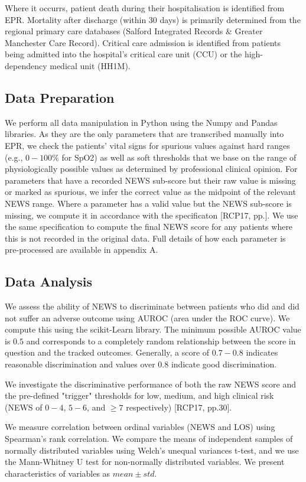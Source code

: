\documentclass[10pt,journal, compsoc]{IEEEtran}
\begin{document}
Where it occurrs, patient death during their hospitalisation is identified from EPR. Mortality after discharge (within 30 days) is primarily determined from the regional primary care databases (Salford Integrated Records \& Greater Manchester Care Record). Critical care admission is identified from patients being admitted into the hospital's critical care unit (CCU) or the high-dependency medical unit (HH1M).

\subsection{Data Preparation} We perform all data manipulation in Python using the Numpy and Pandas libraries. As they are the only parameters that are transcribed manually into EPR, we check the patients' vital signs for spurious values against hard ranges (e.g., $0-100\%$ for SpO2) as well as soft thresholds that we base on the range of physiologically possible values as determined by professional clinical opinion. For parameters that have a recorded NEWS sub-score but their raw value is missing or marked as spurious, we infer the correct value as the midpoint of the relevant NEWS range. Where a parameter has a valid value but the NEWS sub-score is missing, we compute it in accordance with the specificaton [RCP17, pp.]. We use the same specification to compute the final NEWS score for any patients where this is not recorded in the original data. Full details of how each parameter is pre-processed are available in appendix A.

\subsection{Data Analysis} We assess the ability of NEWS to discriminate between patients who did and did not suffer an adverse outcome using AUROC (area under the ROC curve). We compute this using the scikit-Learn library. The minimum possible AUROC value is $0.5$ and corresponds to a completely random relationship between the score in question and the tracked outcomes. Generally, a score of $0.7-0.8$ indicates reasonable discrimination and values over $0.8$ indicate good discrimination.

We investigate the discriminative performance of both the raw NEWS score and the pre-defined "trigger" thresholds for low, medium, and high clinical risk (NEWS of $0-4$, $5-6$, and $\geq 7$ respectively) [RCP17, pp.30].

We measure correlation between ordinal variables (NEWS and LOS) using Spearman's rank correlation. We compare the means of independent samples of normally distributed variables using Welch's unequal variances t-test, and we use the Mann-Whitney U test for non-normally distributed variables. We present characteristics of variables as $mean \pm std$.
\end{document}
